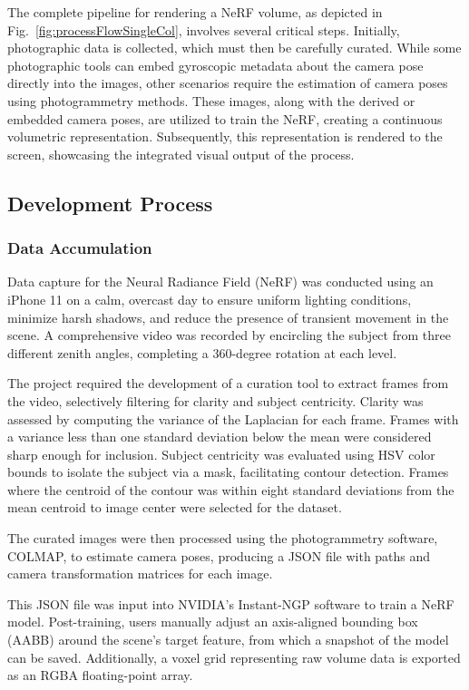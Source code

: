 \documentclass[conference]{IEEEtran}
\begin{document}
The complete pipeline for rendering a NeRF volume, as depicted in Fig.~\ref{fig:processFlowSingleCol}, involves several critical steps. Initially, photographic data is collected, which must then be carefully curated. While some photographic tools can embed gyroscopic metadata about the camera pose directly into the images, other scenarios require the estimation of camera poses using photogrammetry methods. These images, along with the derived or embedded camera poses, are utilized to train the NeRF, creating a continuous volumetric representation. Subsequently, this representation is rendered to the screen, showcasing the integrated visual output of the process.


\subsection{Development Process}
\subsubsection{Data Accumulation}
Data capture for the Neural Radiance Field (NeRF) was conducted using an iPhone 11 on a calm, overcast day to ensure uniform lighting conditions, minimize harsh shadows, and reduce the presence of transient movement in the scene. A comprehensive video was recorded by encircling the subject from three different zenith angles, completing a 360-degree rotation at each level.

The project required the development of a curation tool to extract frames from the video, selectively filtering for clarity and subject centricity. Clarity was assessed by computing the variance of the Laplacian for each frame. Frames with a variance less than one standard deviation below the mean were considered sharp enough for inclusion\cite{gonzalez2002digital}. Subject centricity was evaluated using HSV color bounds to isolate the subject via a mask, facilitating contour detection. Frames where the centroid of the contour was within eight standard deviations from the mean centroid to image center were selected for the dataset.

The curated images were then processed using the photogrammetry software, COLMAP\cite{schoenberger2016sfm}, to estimate camera poses, producing a JSON file with paths and camera transformation matrices for each image.

This JSON file was input into NVIDIA's Instant-NGP software to train a NeRF model\cite{mueller2022instant}. Post-training, users manually adjust an axis-aligned bounding box (AABB) around the scene's target feature, from which a snapshot of the model can be saved. Additionally, a voxel grid representing raw volume data is exported as an RGBA floating-point array.
\end{document}
